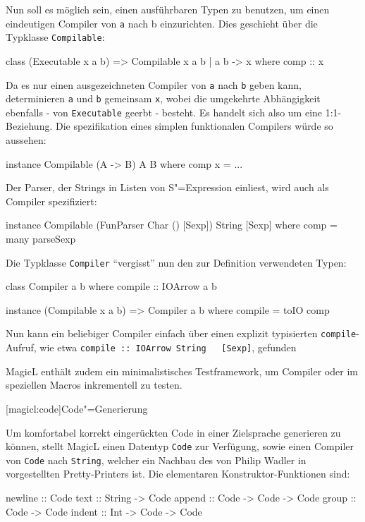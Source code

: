 \documentclass[a4paper, bibgerm]{book}
\newcommand\icode[1]{\lstinline?#1?}
\newcommand\lsection{}
\newcommand{\sexp}{S"=Expression}
\newcommand{\cgen}{Code"=Generierung}
\begin{document}
Nun soll es möglich sein, einen ausführbaren Typen zu benutzen, um einen
eindeutigen Compiler von \icode{a} nach {b} einzurichten. Dies geschieht
über die Typklasse \icode{Compilable}:
\begin{code}
class (Executable x a b) => Compilable x a b | a b -> x where
  comp :: x
\end{code}
Da es nur einen ausgezeichneten Compiler von \icode{a} nach \icode{b}
geben kann, determinieren \icode{a} und \icode{b} gemeinsam \icode{x},
wobei die umgekehrte Abhängigkeit ebenfalls - von \icode{Executable}
geerbt - besteht. Es handelt sich also um eine 1:1-Beziehung. Die
spezifikation eines simplen funktionalen Compilers würde so aussehen:
\begin{code}
instance Compilable (A -> B) A B where
  comp x = ...
\end{code}
Der Parser, der Strings in Listen von \sexp{} einliest, wird auch als
Compiler spezifiziert:
\begin{code}
instance Compilable (FunParser Char () [Sexp]) String [Sexp] where
  comp = many parseSexp
\end{code}
Die Typklasse \icode{Compiler} "`vergisst"' nun den zur Definition
verwendeten Typen:
\begin{code}
class Compiler a b where
  compile :: IOArrow a b
  
instance (Compilable x a b) => Compiler a b where
  compile = toIO comp
\end{code}
Nun kann ein beliebiger Compiler einfach über einen explizit typisierten
\icode{compile}-Aufruf, wie etwa \icode{compile :: IOArrow String
  [Sexp]}, gefunden

MagicL enthält zudem ein minimalistisches Testframework, um Compiler
oder im speziellen Macros inkrementell zu testen.

\lsection[magicl:code]{\cgen{}}

Um komfortabel korrekt eingerückten Code in einer Zielsprache generieren
zu können, stellt MagicL einen Datentyp \icode{Code} zur Verfügung,
sowie einen Compiler von \icode{Code} nach \icode{String}, welcher ein
Nachbau des von Philip Wadler in \cite[S.223ff]{FunOfProgramming}
vorgestellten Pretty-Printers ist. Die elementaren
Konstruktor-Funktionen sind:
\begin{code}
newline :: Code
text    :: String -> Code
append  :: Code   -> Code -> Code
group   :: Code   -> Code
indent  :: Int    -> Code -> Code
\end{code}
\end{document}
